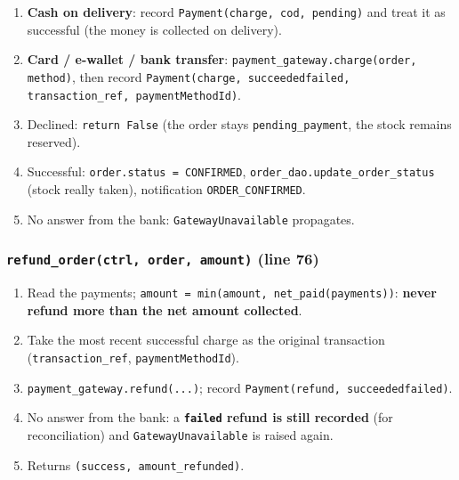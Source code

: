 \begin{enumerate}
\def\labelenumi{\arabic{enumi}.}
\tightlist
\item
  \textbf{Cash on delivery}: record
  \texttt{Payment(\allowbreak{}charge,\allowbreak{} cod,\allowbreak{} pending)} and treat it as successful
  (the money is collected on delivery).
\item
  \textbf{Card / e-wallet / bank transfer}:
  \texttt{payment\_\allowbreak{}gateway.\allowbreak{}charge(\allowbreak{}order,\allowbreak{} method)}, then record
  \texttt{Payment(\allowbreak{}charge,\allowbreak{} succeeded\textbar{}failed,\allowbreak{} transaction\_\allowbreak{}ref,\allowbreak{} paymentMethodId)}.
\item
  Declined: \texttt{return False} (the order stays
  \texttt{pending\_\allowbreak{}payment}, the stock remains reserved).
\item
  Successful: \texttt{order.\allowbreak{}status =\allowbreak{} CONFIRMED},
  \texttt{order\_\allowbreak{}dao.\allowbreak{}update\_\allowbreak{}order\_\allowbreak{}status} (stock really taken),
  notification \texttt{ORDER\_\allowbreak{}CONFIRMED}.
\item
  No answer from the bank: \texttt{GatewayUnavailable} propagates.
\end{enumerate}

\hypertarget{refund_orderctrl-order-amount-line-76}{%
\subsubsection{\texorpdfstring{\texttt{refund\_\allowbreak{}order(\allowbreak{}ctrl,\allowbreak{} order,\allowbreak{} amount)}
(line
76)}{refund\_order(ctrl, order, amount) (line 76)}}\label{refund_orderctrl-order-amount-line-76}}

\begin{enumerate}
\def\labelenumi{\arabic{enumi}.}
\tightlist
\item
  Read the payments;
  \texttt{amount =\allowbreak{} min(\allowbreak{}amount,\allowbreak{} net\_\allowbreak{}paid(\allowbreak{}payments))}: \textbf{never
  refund more than the net amount collected}.
\item
  Take the most recent successful charge as the original transaction
  (\texttt{transaction\_\allowbreak{}ref}, \texttt{paymentMethodId}).
\item
  \texttt{payment\_\allowbreak{}gateway.\allowbreak{}refund(\allowbreak{}.\allowbreak{}.\allowbreak{}.\allowbreak{})}; record
  \texttt{Payment(\allowbreak{}refund,\allowbreak{} succeeded\textbar{}failed)}.
\item
  No answer from the bank: a \textbf{\texttt{failed} refund is still
  recorded} (for reconciliation) and \texttt{GatewayUnavailable} is
  raised again.
\item
  Returns \texttt{(\allowbreak{}success,\allowbreak{} amount\_\allowbreak{}refunded)}.
\end{enumerate}

